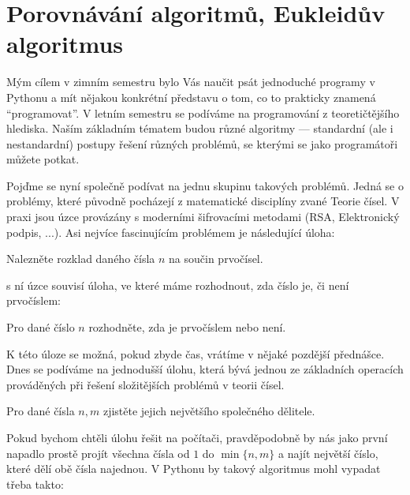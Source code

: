 \ifx\ucebnice\undefined

\setcounter{section}{0}
\fi
\section{Porovnávání algoritmů, Eukleidův algoritmus}

Mým cílem v zimním semestru bylo Vás naučit psát jednoduché programy v Pythonu a mít nějakou konkrétní představu o tom,
co to prakticky znamená ``programovat''. V letním semestru se podíváme na programování z teoretičtějšího hlediska.
Naším základním tématem budou různé algoritmy --- standardní (ale i nestandardní) postupy řešení různých problémů, 
se kterými se jako programátoři můžete potkat. 

Pojďme se nyní společně podívat na jednu skupinu takových problémů. Jedná se o problémy, které původně pocházejí z
matematické disciplíny zvané Teorie čísel. V praxi jsou úzce provázány s moderními šifrovacími metodami 
(RSA, Elektronický podpis, ...). Asi nejvíce fascinujícím problémem je následující úloha:

\begin{ukol}
Nalezněte rozklad daného čísla $n$ na součin prvočísel.
\end{ukol}

s ní úzce souvisí úloha, ve které máme rozhodnout, zda číslo je, či není prvočíslem:

\begin{ukol}
Pro dané číslo $n$ rozhodněte, zda je prvočíslem nebo není.
\end{ukol}

K této úloze se možná, pokud zbyde čas, vrátíme v nějaké pozdější přednášce. Dnes se podíváme na jednodušší úlohu, která
bývá jednou ze základních operacích prováděných při řešení složitějších problémů v teorii čísel. 

\begin{ukol}
Pro dané čísla $n,m$ zjistěte jejich největšího společného dělitele.
\end{ukol}


Pokud bychom chtěli úlohu řešit na počítači, pravděpodobně by nás jako první napadlo prostě
projít všechna čísla od $1$ do $\min \{n,m\}$ a najít největší číslo, které dělí obě čísla najednou.
V Pythonu by takový algoritmus mohl vypadat třeba takto:

